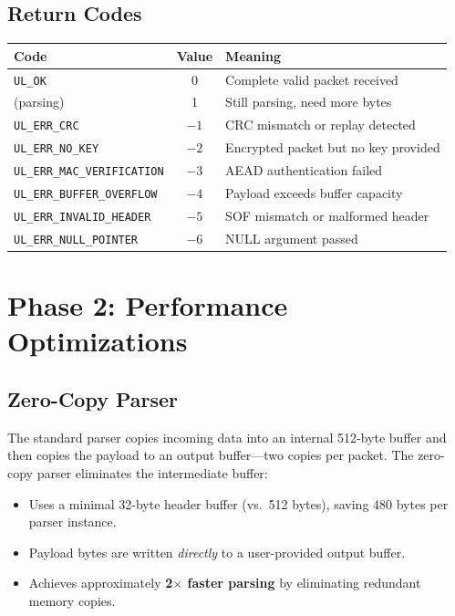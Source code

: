 \documentclass[11pt,a4paper]{article}
\begin{document}
\subsection{Return Codes}

\begin{table}[H]
\centering
\begin{tabular}{@{}lcl@{}}
\toprule
\textbf{Code} & \textbf{Value} & \textbf{Meaning} \\
\midrule
\texttt{UL\_OK}                   &  0 & Complete valid packet received \\
(parsing)                         &  1 & Still parsing, need more bytes \\
\texttt{UL\_ERR\_CRC}             & $-1$ & CRC mismatch or replay detected \\
\texttt{UL\_ERR\_NO\_KEY}         & $-2$ & Encrypted packet but no key provided \\
\texttt{UL\_ERR\_MAC\_VERIFICATION} & $-3$ & AEAD authentication failed \\
\texttt{UL\_ERR\_BUFFER\_OVERFLOW} & $-4$ & Payload exceeds buffer capacity \\
\texttt{UL\_ERR\_INVALID\_HEADER} & $-5$ & SOF mismatch or malformed header \\
\texttt{UL\_ERR\_NULL\_POINTER}   & $-6$ & NULL argument passed \\
\bottomrule
\end{tabular}
\end{table}

\section{Phase 2: Performance Optimizations}

\subsection{Zero-Copy Parser}

The standard parser copies incoming data into an internal 512-byte buffer and then copies the payload to an output buffer---two copies per packet. The zero-copy parser eliminates the intermediate buffer:

\begin{itemize}[noitemsep]
    \item Uses a minimal 32-byte header buffer (vs.\ 512 bytes), saving 480 bytes per parser instance.
    \item Payload bytes are written \emph{directly} to a user-provided output buffer.
    \item Achieves approximately \textbf{2$\times$ faster parsing} by eliminating redundant memory copies.
\end{itemize}
\end{document}
